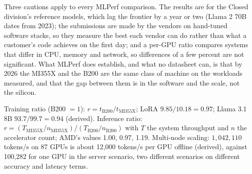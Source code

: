 \documentclass[11pt,letterpaper]{article}
\newenvironment{formulas}{\begin{tcolorbox}[formulabox]}{\end{tcolorbox}}
\begin{document}
Three cautions apply to every MLPerf comparison. The results are for the Closed division's reference models, which lag the frontier by a year or two (Llama 2 70B dates from 2023); the submissions are made by the vendors on hand-tuned software stacks, so they measure the best each vendor can do rather than what a customer's code achieves on the first day; and a per-GPU ratio compares systems that differ in CPU, memory and network, so differences of a few percent are not significant. What MLPerf does establish, and what no datasheet can, is that by 2026 the MI355X and the B200 are the same class of machine on the workloads measured, and that the gap between them is in the software and the scale, not the silicon.

\begin{formulas}
Training ratio (B200 $= 1$): $r = t_{\text{B200}}/t_{\text{MI355X}}$; LoRA $9.85/10.18 = 0.97$; Llama 3.1 8B $93.7/99.7 = 0.94$ (derived). Inference ratio: $r = (T_{\text{MI355X}}/n_{\text{MI355X}})/(T_{\text{B200}}/n_{\text{B200}})$ with $T$ the system throughput and $n$ the accelerator count; AMD's values 1.00, 0.97, 1.19. Multi-node scaling: $1{,}042{,}110$ tokens/s on 87 GPUs is about 12{,}000 tokens/s per GPU offline (derived), against 100{,}282 for one GPU in the server scenario, two different scenarios on different accuracy and latency terms.
\end{formulas}
\end{document}
